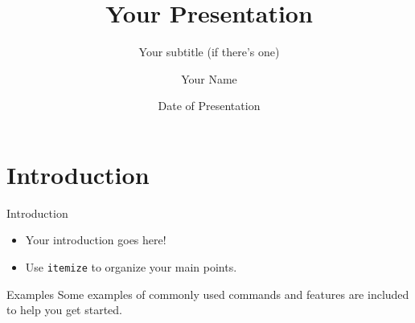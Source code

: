 \documentclass[10pt,xcolor={table,dvipsnames},t]{beamer}
\title[Your Short Title]{Your Presentation}
\subtitle{Your subtitle (if there's one)}
\author{Your Name}
\institute{Your Faculty/Department}
\date{Date of Presentation}
\begin{document}
\begin{frame}
  \titlepage
\end{frame}

\section{Introduction}

\begin{frame}{Introduction}
  \begin{itemize}
    \item Your introduction goes here!
    \item Use \texttt{itemize} to organize your main points.
  \end{itemize}

  \begin{block}{Examples}
    Some examples of commonly used commands and features are included to help you get started.
  \end{block}
\end{frame}
\end{document}
